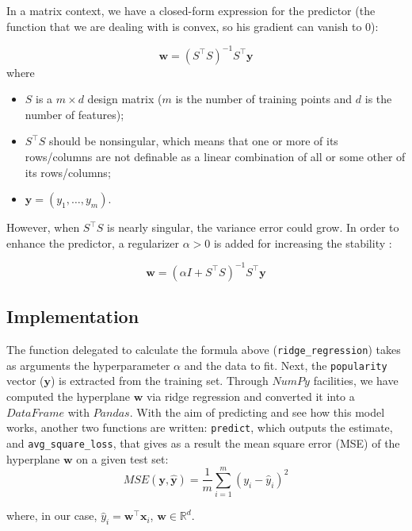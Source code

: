 \documentclass{article}
\begin{document}
In a matrix context, we have a closed-form expression for the predictor (the function that we are dealing with is convex, so his gradient can vanish to $0$):
    
\begin{equation}
	\boldsymbol{w} = (S^\top S)^{-1}S^\top \boldsymbol{y}
\end{equation}
where 
\begin{itemize}
	\item $S$ is a $m \times d$ design matrix ($m$ is the number of training points and $d$ is the number of features);
	\item $S^\top S$ should be nonsingular, which means that one or more of its rows/columns are not definable as a linear combination of all or some other of its rows/columns;
	\item $\boldsymbol{y} = (y_1, \dots , y_m)$.
\end{itemize}
    
However, when $S^\top S$ is nearly singular, the variance error could grow. In order to enhance the predictor, a regularizer $\alpha > 0$ is added for increasing the stability \cite{profrr}:

\begin{equation}
	\boldsymbol{w} = (\alpha I + S^\top S)^{-1}S^\top \boldsymbol{y}
\end{equation}

\subsection{Implementation}
The function delegated to calculate the formula above (\texttt{ridge\_regression}) takes as arguments the hyperparameter $\alpha$ and the data to fit. Next, the \texttt{popularity} vector ($\boldsymbol{y}$) is extracted from the training set. Through $NumPy$ facilities, we have computed the hyperplane $\boldsymbol{w}$ via ridge regression and converted it into a $DataFrame$ with $Pandas$. 
With the aim of predicting and see how this model works, another two functions are written:
\texttt{predict}, which outputs the estimate, and \texttt{avg\_square\_loss}, that gives as a result the mean square error (MSE) of the hyperplane $\boldsymbol{w}$ on a given test set: 
\begin{equation}
	\label{MSE}MSE(\boldsymbol{y},\boldsymbol{\hat{y}}) = \frac{1}{m}\sum_{i = 1}^m (y_i-\hat{y}_i)^2
\end{equation}
    
where, in our case, $\hat{y}_i= \boldsymbol{w}^\top \boldsymbol{x}_i$, $\boldsymbol{w} \in \mathbb{R}^d$.
    
\end{document}

